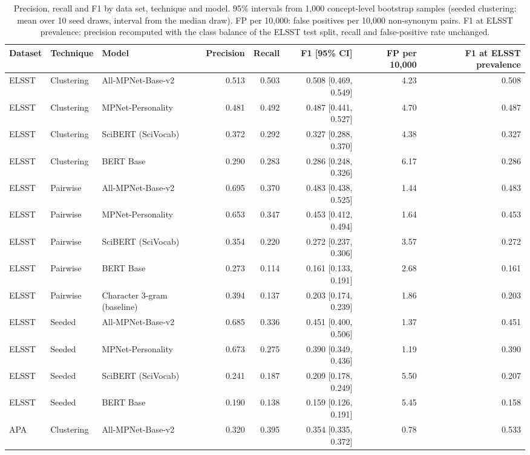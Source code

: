 \begin{table}[ht]
\centering
\small
\caption{Precision, recall and F1 by data set, technique and model. 95\% intervals from 1,000 concept-level bootstrap samples (seeded clustering: mean over 10 seed draws, interval from the median draw). FP per 10,000: false positives per 10,000 non-synonym pairs. F1 at ELSST prevalence: precision recomputed with the class balance of the ELSST test split, recall and false-positive rate unchanged.}
\label{tab:table1_primary_performance}
\begin{tabular}{lllrrrrr}
\toprule
Dataset & Technique & Model & Precision & Recall & F1 [95\% CI] & FP per 10,000 & F1 at ELSST prevalence \\
\midrule
ELSST & Clustering & All-MPNet-Base-v2 & 0.513 & 0.503 & 0.508 [0.469, 0.549] & 4.23 & 0.508 \\
ELSST & Clustering & MPNet-Personality & 0.481 & 0.492 & 0.487 [0.441, 0.527] & 4.70 & 0.487 \\
ELSST & Clustering & SciBERT (SciVocab) & 0.372 & 0.292 & 0.327 [0.288, 0.370] & 4.38 & 0.327 \\
ELSST & Clustering & BERT Base & 0.290 & 0.283 & 0.286 [0.248, 0.326] & 6.17 & 0.286 \\
ELSST & Pairwise & All-MPNet-Base-v2 & 0.695 & 0.370 & 0.483 [0.438, 0.525] & 1.44 & 0.483 \\
ELSST & Pairwise & MPNet-Personality & 0.653 & 0.347 & 0.453 [0.412, 0.494] & 1.64 & 0.453 \\
ELSST & Pairwise & SciBERT (SciVocab) & 0.354 & 0.220 & 0.272 [0.237, 0.306] & 3.57 & 0.272 \\
ELSST & Pairwise & BERT Base & 0.273 & 0.114 & 0.161 [0.133, 0.191] & 2.68 & 0.161 \\
ELSST & Pairwise & Character 3-gram (baseline) & 0.394 & 0.137 & 0.203 [0.174, 0.239] & 1.86 & 0.203 \\
ELSST & Seeded & All-MPNet-Base-v2 & 0.685 & 0.336 & 0.451 [0.400, 0.506] & 1.37 & 0.451 \\
ELSST & Seeded & MPNet-Personality & 0.673 & 0.275 & 0.390 [0.349, 0.436] & 1.19 & 0.390 \\
ELSST & Seeded & SciBERT (SciVocab) & 0.241 & 0.187 & 0.209 [0.178, 0.249] & 5.50 & 0.207 \\
ELSST & Seeded & BERT Base & 0.190 & 0.138 & 0.159 [0.126, 0.191] & 5.45 & 0.158 \\
APA & Clustering & All-MPNet-Base-v2 & 0.320 & 0.395 & 0.354 [0.335, 0.372] & 0.78 & 0.533 \\

\end{tabular}
\end{table}
